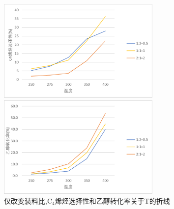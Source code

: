 \documentclass[a4paper,10.5pt]{ctexart}
\begin{document}
\begin{figure}[h]
\centering
\begin{minipage}[t]{0.48\textwidth}
\centering
\includegraphics[width=8cm]{100g1wt1.68装料比C4.png}
\end{minipage}
\begin{minipage}[t]{0.48\textwidth}
\centering
\includegraphics[width=8cm]{100g1wt1.68装料比乙醇.png}
\end{minipage}
\caption{\centering 仅改变装料比,C$_4$烯烃选择性和乙醇转化率关于T的折线}
\end{figure}
\end{document}
